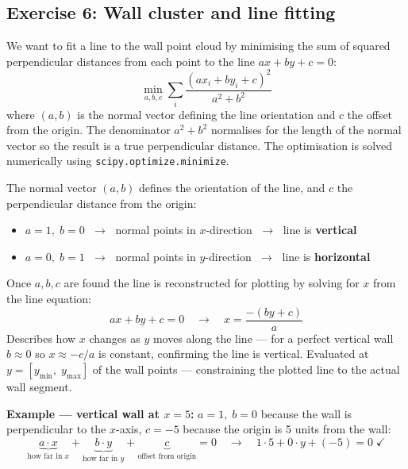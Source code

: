 \documentclass[12pt, a4paper]{article}
\begin{document}
\subsection*{Exercise 6: Wall cluster and line fitting}

We want to fit a line to the wall point cloud by minimising the sum of
squared perpendicular distances from each point to the line $ax+by+c=0$:
\[
  \min_{a,b,c} \sum_{i} \frac{(ax_i + by_i + c)^2}{a^2 + b^2}
\]
where $(a,b)$ is the normal vector defining the line orientation and $c$
the offset from the origin. The denominator $a^2+b^2$ normalises for the
length of the normal vector so the result is a true perpendicular distance.
The optimisation is solved numerically using \texttt{scipy.optimize.minimize}.

The normal vector $(a, b)$ defines the orientation of the line,
and $c$ the perpendicular distance from the origin:
\begin{itemize}[leftmargin=1.4em]
  \item $a=1,\; b=0$ $\;\rightarrow\;$ normal points in $x$-direction
        $\;\rightarrow\;$ line is \textbf{vertical}
  \item $a=0,\; b=1$ $\;\rightarrow\;$ normal points in $y$-direction
        $\;\rightarrow\;$ line is \textbf{horizontal}
\end{itemize}

Once $a,b,c$ are found the line is reconstructed for plotting by solving
for $x$ from the line equation:
\[
  ax + by + c = 0 \quad\rightarrow\quad x = \frac{-(by + c)}{a}
\]
Describes how $x$ changes as $y$ moves along the line ---
for a perfect vertical wall $b \approx 0$ so $x \approx -c/a$ is constant,
confirming the line is vertical.
Evaluated at $y = [y_{\min},\; y_{\max}]$ of the wall points ---
constraining the plotted line to the actual wall segment.

\begin{notebox}
  \textbf{Example --- vertical wall at $x=5$:}
  $a=1,\; b=0$ because the wall is perpendicular to the $x$-axis,
  $c=-5$ because the origin is 5 units from the wall:
  \[
    \underbrace{a\cdot x}_{\text{how far in }x} +
    \underbrace{b\cdot y}_{\text{how far in }y} +
    \underbrace{c}_{\text{offset from origin}} = 0
    \quad\rightarrow\quad
    1\cdot5 + 0\cdot y + (-5) = 0 \;\checkmark
  \]
\end{notebox}
\end{document}
